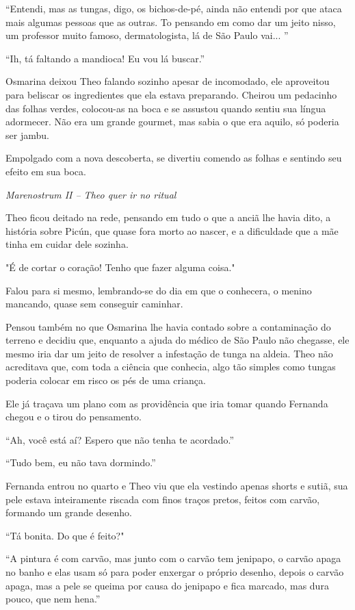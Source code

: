 ``Entendi, mas as tungas, digo, os bichos-de-pé, ainda não entendi por
que ataca mais algumas pessoas que as outras. To pensando em como dar um
jeito nisso, um professor muito famoso, dermatologista, lá de São Paulo
vai... ''

``Ih, tá faltando a mandioca! Eu vou lá buscar.''

Osmarina deixou Theo falando sozinho apesar de incomodado, ele
aproveitou para beliscar os ingredientes que ela estava preparando.
Cheirou um pedacinho das folhas verdes, colocou-as na boca e se assustou
quando sentiu sua língua adormecer. Não era um grande gourmet, mas sabia
o que era aquilo, só poderia ser jambu.

Empolgado com a nova descoberta, se divertiu comendo as folhas e
sentindo seu efeito em sua boca.

\asterisc

\emph{Marenostrum II -- Theo quer ir no ritual}

Theo ficou deitado na rede, pensando em tudo o que a anciã lhe havia
dito, a história sobre Picún, que quase fora morto ao nascer, e a
dificuldade que a mãe tinha em cuidar dele sozinha.

"É de cortar o coração! Tenho que fazer alguma coisa."

Falou para si mesmo, lembrando-se do dia em que o conhecera, o menino
mancando, quase sem conseguir caminhar.

Pensou também no que Osmarina lhe havia contado sobre a contaminação do
terreno e decidiu que, enquanto a ajuda do médico de São Paulo não
chegasse, ele mesmo iria dar um jeito de resolver a infestação de tunga
na aldeia. Theo não acreditava que, com toda a ciência que conhecia,
algo tão simples como tungas poderia colocar em risco os pés de uma
criança.

Ele já traçava um plano com as providência que iria tomar quando
Fernanda chegou e o tirou do pensamento.

``Ah, você está aí? Espero que não tenha te acordado.''

``Tudo bem, eu não tava dormindo.''

Fernanda entrou no quarto e Theo viu que ela vestindo apenas shorts e
sutiã, sua pele estava inteiramente riscada com finos traços pretos,
feitos com carvão, formando um grande desenho.

``Tá bonita. Do que é feito?"

``A pintura é com carvão, mas junto com o carvão tem jenipapo, o carvão
apaga no banho e elas usam só para poder enxergar o próprio desenho,
depois o carvão apaga, mas a pele se queima por causa do jenipapo e fica
marcado, mas dura pouco, que nem hena.''

